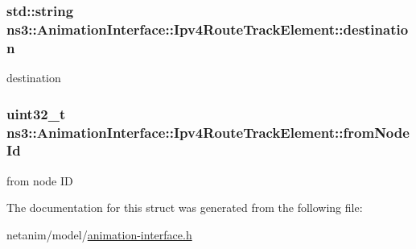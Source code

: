 \subsubsection[{\texorpdfstring{destination}{destination}}]{\setlength{\rightskip}{0pt plus 5cm}std\+::string ns3\+::\+Animation\+Interface\+::\+Ipv4\+Route\+Track\+Element\+::destination}\hypertarget{structns3_1_1AnimationInterface_1_1Ipv4RouteTrackElement_aa94a82342e6900fbe19427c56f134181}{}\label{structns3_1_1AnimationInterface_1_1Ipv4RouteTrackElement_aa94a82342e6900fbe19427c56f134181}


destination 

\subsubsection[{\texorpdfstring{from\+Node\+Id}{fromNodeId}}]{\setlength{\rightskip}{0pt plus 5cm}uint32\+\_\+t ns3\+::\+Animation\+Interface\+::\+Ipv4\+Route\+Track\+Element\+::from\+Node\+Id}\hypertarget{structns3_1_1AnimationInterface_1_1Ipv4RouteTrackElement_a09d9702792a65e22bc4933962ade30be}{}\label{structns3_1_1AnimationInterface_1_1Ipv4RouteTrackElement_a09d9702792a65e22bc4933962ade30be}


from node ID 



The documentation for this struct was generated from the following file\+:\begin{DoxyCompactItemize}
\item 
netanim/model/\hyperlink{animation-interface_8h}{animation-\/interface.\+h}\end{DoxyCompactItemize}

